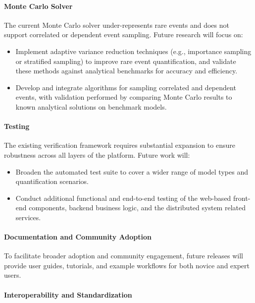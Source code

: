 \paragraph{Monte Carlo Solver}

The current Monte Carlo solver under-represents rare events and does not support correlated or dependent event sampling. Future research will focus on:
\begin{itemize}
    \item Implement adaptive variance reduction techniques (e.g., importance sampling or stratified sampling) to improve rare event quantification, and validate these methods against analytical benchmarks for accuracy and efficiency.
    \item Develop and integrate algorithms for sampling correlated and dependent events, with validation performed by comparing Monte Carlo results to known analytical solutions on benchmark models.
\end{itemize}

\paragraph{Testing}

The existing verification framework requires substantial expansion to ensure robustness across all layers of the platform. Future work will:
\begin{itemize}
    \item Broaden the automated test suite to cover a wider range of model types and quantification scenarios.
    \item Conduct additional functional and end-to-end testing of the web-based front-end components, backend business logic, and the distributed system related services.
\end{itemize}

\paragraph{Documentation and Community Adoption}

To facilitate broader adoption and community engagement, future releases will provide user guides, tutorials, and example workflows for both novice and expert users.

\paragraph{Interoperability and Standardization}

